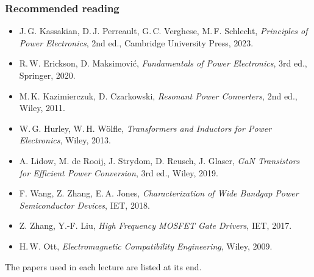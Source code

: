 \begin{frame}
	\frametitle{Recommended reading}
	\small
	\begin{itemize}
		\item J.\,G. Kassakian, D.\,J. Perreault, G.\,C. Verghese, M.\,F. Schlecht, \textit{Principles of Power Electronics}, 2nd ed., Cambridge University Press, 2023.
		\item R.\,W. Erickson, D. Maksimovi\'c, \textit{Fundamentals of Power Electronics}, 3rd ed., Springer, 2020.
		\item M.\,K. Kazimierczuk, D. Czarkowski, \textit{Resonant Power Converters}, 2nd ed., Wiley, 2011.
		\item W.\,G. Hurley, W.\,H. W\"olfle, \textit{Transformers and Inductors for Power Electronics}, Wiley, 2013.
		\item A. Lidow, M. de Rooij, J. Strydom, D. Reusch, J. Glaser, \textit{GaN Transistors for Efficient Power Conversion}, 3rd ed., Wiley, 2019.
		\item F. Wang, Z. Zhang, E.\,A. Jones, \textit{Characterization of Wide Bandgap Power Semiconductor Devices}, IET, 2018.
		\item Z. Zhang, Y.-F. Liu, \textit{High Frequency MOSFET Gate Drivers}, IET, 2017.
		\item H.\,W. Ott, \textit{Electromagnetic Compatibility Engineering}, Wiley, 2009.
	\end{itemize}
	The papers used in each lecture are listed at its end.
\end{frame}

